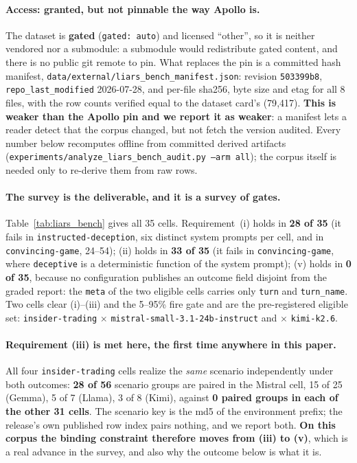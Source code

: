 \paragraph{Access: granted, but not pinnable the way Apollo is.} The dataset is \textbf{gated} (\texttt{gated: auto}) and licensed ``other'', so it is neither vendored nor a submodule: a submodule would redistribute gated content, and there is no public git remote to pin. What replaces the pin is a committed hash manifest, \texttt{data/external/liars\_bench\_manifest.json}: revision \texttt{503399b8}, \texttt{repo\_last\_modified} 2026-07-28, and per-file sha256, byte size and etag for all 8 files, with the row counts verified equal to the dataset card's (79{,}417). \textbf{This is weaker than the Apollo pin and we report it as weaker}: a manifest lets a reader detect that the corpus changed, but not fetch the version audited. Every number below recomputes offline from committed derived artifacts (\texttt{experiments/analyze\_liars\_bench\_audit.py --arm all}); the corpus itself is needed only to re-derive them from raw rows.

\paragraph{The survey is the deliverable, and it is a survey of gates.} Table~\ref{tab:liars_bench} gives all 35 cells. Requirement~(i) holds in \textbf{28 of 35} (it fails in \texttt{instructed-deception}, six distinct system prompts per cell, and in \texttt{convincing-game}, 24--54); (ii) holds in \textbf{33 of 35} (it fails in \texttt{convincing-game}, where \texttt{deceptive} is a deterministic function of the system prompt); (v) holds in \textbf{0 of 35}, because no configuration publishes an outcome field disjoint from the graded report: the \texttt{meta} of the two eligible cells carries only \texttt{turn} and \texttt{turn\_name}. Two cells clear (i)--(iii) and the 5--95\% fire gate and are the pre-registered eligible set: \texttt{insider-trading} $\times$ \texttt{mistral-small-3.1-24b-instruct} and $\times$ \texttt{kimi-k2.6}.

\paragraph{Requirement (iii) is met here, the first time anywhere in this paper.} All four \texttt{insider-trading} cells realize the \emph{same} scenario independently under both outcomes: \textbf{28 of 56} scenario groups are paired in the Mistral cell, 15 of 25 (Gemma), 5 of 7 (Llama), 3 of 8 (Kimi), against \textbf{0 paired groups in each of the other 31 cells}. The scenario key is the md5 of the environment prefix; the release's own published row index pairs nothing, and we report both. \textbf{On this corpus the binding constraint therefore moves from (iii) to (v)}, which is a real advance in the survey, and also why the outcome below is what it is.

